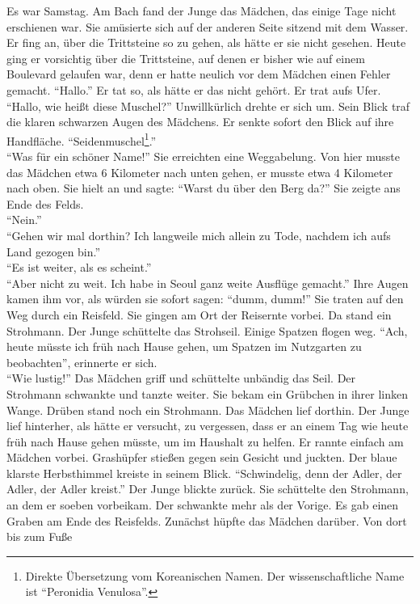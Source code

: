 \documentclass[prd,12pt,tightenlines,notitlepage,nofootinbib]{revtex4-1}
\begin{document}
Es war Samstag.  Am Bach fand der Junge das Mädchen, das einige
Tage nicht erschienen war.  Sie amüsierte sich auf der anderen Seite sitzend mit dem Wasser.  Er fing an, über die Trittsteine so zu gehen, als hätte er sie
nicht gesehen.  Heute ging er vorsichtig über die Trittsteine, auf denen
er bisher wie auf einem Boulevard gelaufen war, denn er hatte neulich vor dem
Mädchen einen Fehler gemacht.  "`Hallo."'  Er tat so, als hätte er das nicht
gehört.  Er trat aufs Ufer.  "`Hallo, wie heißt diese Muschel?"'
Unwillkürlich drehte er sich um.  Sein Blick traf die klaren schwarzen
Augen des Mädchens.  Er senkte sofort den Blick auf ihre Handfläche.
"`Seidenmuschel\footnote{Direkte Übersetzung vom Koreanischen Namen.
  Der wissenschaftliche Name ist "`Peronidia Venulosa"'.}."'\\
"`Was für ein schöner Name!"'  Sie erreichten eine Weggabelung.
Von hier musste das Mädchen etwa 6 Kilometer nach unten gehen, er musste
etwa 4 Kilometer nach oben.  Sie hielt an und sagte: "`Warst du über den
Berg da?"'  Sie zeigte ans Ende des Felds.\\
"`Nein."'\\
"`Gehen wir mal dorthin?
Ich langweile mich allein zu Tode, nachdem ich aufs Land
gezogen bin."'\\
"`Es ist weiter, als es scheint."'\\
"`Aber nicht zu weit.
Ich habe in Seoul ganz weite Ausflüge gemacht."'  Ihre Augen kamen ihm
vor, als würden sie sofort sagen: "`dumm, dumm!"'  Sie traten auf den Weg
durch ein Reisfeld.  Sie gingen am Ort der Reisernte vorbei.
Da stand ein Strohmann.  Der Junge schüttelte das Strohseil.  Einige
Spatzen flogen weg.  "`Ach, heute müsste ich früh nach Hause gehen, um
Spatzen im Nutzgarten zu beobachten"', erinnerte er sich.\\
"`Wie lustig!"'
Das Mädchen griff und schüttelte unbändig das Seil.  Der Strohmann schwankte und
tanzte weiter.  Sie bekam ein Grübchen in ihrer linken Wange.  Drüben
stand noch ein Strohmann.  Das Mädchen lief dorthin.  Der Junge lief hinterher,
als hätte er versucht, zu vergessen, dass er an einem Tag wie heute
früh nach Hause gehen müsste, um im Haushalt zu helfen.  Er rannte
einfach am Mädchen vorbei.  Grashüpfer stießen gegen sein
Gesicht und juckten.  Der blaue klarste Herbsthimmel kreiste in seinem Blick.
"`Schwindelig, denn der Adler, der Adler, der Adler kreist."'  Der Junge blickte
zurück.  Sie schüttelte den Strohmann, an dem er soeben vorbeikam.  Der
schwankte mehr als der Vorige.  Es gab einen Graben am Ende des
Reisfelds.  Zunächst hüpfte das Mädchen darüber.  Von dort bis zum Fuße
\end{document}
